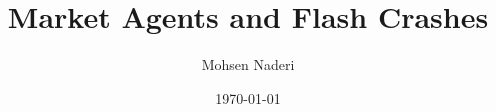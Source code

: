 \documentclass[oneside,british,phd]{ucl_thesis}
\newif\ifdraftheading
\begin{document}


\ifdraftheading
  \newwatermark[
    allpages=true,
    angle=0,
    align=center,
    textcolor=magenta!40,
    fontsize=12pt,
    xpos=.1\paperwidth,
    ypos=.4\paperheight
  ]{MN Thesis Draft, \today -- \currenttime~P.~\thepage/\lastpageref*{LastPages}}
\fi


\title{Market Agents and Flash Crashes}
\author{Mohsen Naderi}
\date{\today}

\maketitle






\clearpage
{}
{}
\tableofcontents
{}

\clearpage
\listoffigures
\clearpage
\listoftables

\end{document}
